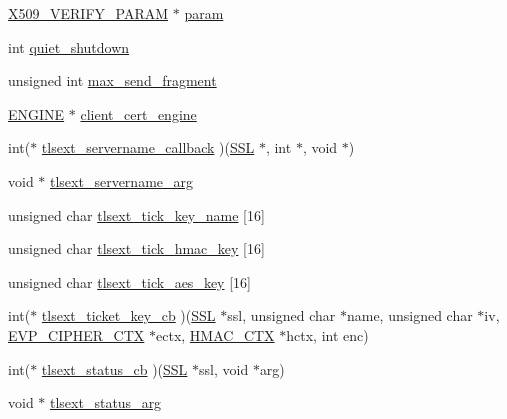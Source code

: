 \begin{DoxyCompactItemize}
\item 
\hyperlink{x509__vfy_8h_a9b8209a7a29bafa279e1b5bc5f81cb23}{X509\+\_\+\+V\+E\+R\+I\+F\+Y\+\_\+\+P\+A\+R\+AM} $\ast$ \hyperlink{structssl__ctx__st_a27c15c2ea4e216baacb44a5bf166cfa1}{param}
\item 
int \hyperlink{structssl__ctx__st_a325f28f265dae1b20da7c813e41bdb96}{quiet\+\_\+shutdown}
\item 
unsigned int \hyperlink{structssl__ctx__st_aab1f54a0e69246d749a6f6ad249c2176}{max\+\_\+send\+\_\+fragment}
\item 
\hyperlink{ossl__typ_8h_abac45b251498719318e60ab8d6192510}{E\+N\+G\+I\+NE} $\ast$ \hyperlink{structssl__ctx__st_ae6bb617a63017d5c8e7eccc6f8030185}{client\+\_\+cert\+\_\+engine}
\item 
int($\ast$ \hyperlink{structssl__ctx__st_aa6c57ade4e374ba2092309192e700b45}{tlsext\+\_\+servername\+\_\+callback} )(\hyperlink{ossl__typ_8h_a71f21e09bf365489dab9d85bd4785e24}{S\+SL} $\ast$, int $\ast$, void $\ast$)
\item 
void $\ast$ \hyperlink{structssl__ctx__st_a2ab57baeccaab0b8d7ecc9c478f3ee14}{tlsext\+\_\+servername\+\_\+arg}
\item 
unsigned char \hyperlink{structssl__ctx__st_a7f5cf468448dbbe1ae706c152d4abee5}{tlsext\+\_\+tick\+\_\+key\+\_\+name} \mbox{[}16\mbox{]}
\item 
unsigned char \hyperlink{structssl__ctx__st_a3bbed4399466da935affa8b11dc37967}{tlsext\+\_\+tick\+\_\+hmac\+\_\+key} \mbox{[}16\mbox{]}
\item 
unsigned char \hyperlink{structssl__ctx__st_ad6776ce4d46e74ca3580f34365c53b41}{tlsext\+\_\+tick\+\_\+aes\+\_\+key} \mbox{[}16\mbox{]}
\item 
int($\ast$ \hyperlink{structssl__ctx__st_a87b05e20d2f45baa5f9a6ea0cd2d08c5}{tlsext\+\_\+ticket\+\_\+key\+\_\+cb} )(\hyperlink{ossl__typ_8h_a71f21e09bf365489dab9d85bd4785e24}{S\+SL} $\ast$ssl, unsigned char $\ast$name, unsigned char $\ast$iv, \hyperlink{ossl__typ_8h_aab2bd6a044e1d31ebc2fe82b3b0b3d9a}{E\+V\+P\+\_\+\+C\+I\+P\+H\+E\+R\+\_\+\+C\+TX} $\ast$ectx, \hyperlink{hmac_8h_aac042740b33d6ad59d219de07a6f8461}{H\+M\+A\+C\+\_\+\+C\+TX} $\ast$hctx, int enc)
\item 
int($\ast$ \hyperlink{structssl__ctx__st_a950b7e9a873dcdd4af6363290e35d484}{tlsext\+\_\+status\+\_\+cb} )(\hyperlink{ossl__typ_8h_a71f21e09bf365489dab9d85bd4785e24}{S\+SL} $\ast$ssl, void $\ast$arg)
\item 
void $\ast$ \hyperlink{structssl__ctx__st_a34c025b8e62d9ade63d51808d9271192}{tlsext\+\_\+status\+\_\+arg}

\end{DoxyCompactItemize}
